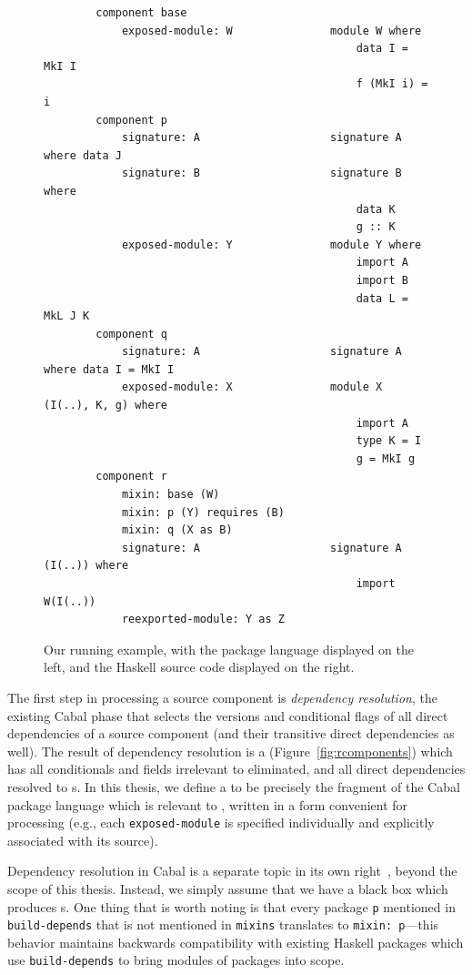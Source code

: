 \begin{figure}
\begin{verbatim}
        component base
            exposed-module: W               module W where
                                                data I = MkI I
                                                f (MkI i) = i
        component p
            signature: A                    signature A where data J
            signature: B                    signature B where
                                                data K
                                                g :: K
            exposed-module: Y               module Y where
                                                import A
                                                import B
                                                data L = MkL J K
        component q
            signature: A                    signature A where data I = MkI I
            exposed-module: X               module X (I(..), K, g) where
                                                import A
                                                type K = I
                                                g = MkI g
        component r
            mixin: base (W)
            mixin: p (Y) requires (B)
            mixin: q (X as B)
            signature: A                    signature A (I(..)) where
                                                import W(I(..))
            reexported-module: Y as Z
\end{verbatim}
  \caption{Our running example, with the package language displayed
  on the left, and the Haskell source code displayed on the right.}\label{fig:resolved-example}
\end{figure}

The first step in
processing a source component is \emph{dependency resolution},
the existing Cabal phase that
selects the versions and conditional flags of all direct dependencies of
a source component (and their transitive direct dependencies as well).
The result of dependency resolution is a \emph{\ccomp}
(Figure~\ref{fig:rcomponents}) which has all conditionals and fields
irrelevant to \Backpack{} eliminated, and all direct dependencies
resolved to \cid{}s.  In this thesis, we define a \ccomp{} to be precisely the fragment of the
Cabal package language which is relevant to \Backpack{}, written in a
form convenient for processing (e.g., each \verb|exposed-module| is
specified individually and explicitly associated with its source).

Dependency resolution in Cabal is a separate topic in its own
right~\cite{well-typed-solver, well-typed-qualified}, beyond the scope of this thesis.
Instead, we simply assume that we have a black box which
produces \ccomp{}s.  One thing that is worth noting is that
every package \verb|p| mentioned in \verb|build-depends|
that is not mentioned in \verb|mixins| translates to
\verb|mixin: p|---this behavior maintains backwards compatibility
with existing Haskell packages which use \verb|build-depends| to
bring modules of packages into scope.

